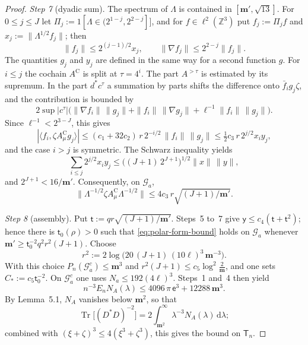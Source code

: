 \documentclass[11pt]{amsart}
\theoremstyle{definition}
\begin{document}
\begin{proof}
\emph{Step 7} (dyadic sum).
The spectrum of $\Lambda$ is contained in $[\mathbf m',\sqrt{13}]$.
For $0\le j\le J$ let $\Pi_j:=1[\Lambda\in(2^{1-j},2^{2-j}]]$, and for $f\in\ell^2(\mathbb Z^3)$ put $f_j:=\Pi_jf$ and $x_j:=\|\Lambda^{1/2}f_j\|$; then
\begin{equation*}
\|f_j\|\le2^{(j-1)/2}x_j,\qquad\|\nabla f_j\|\le2^{2-j}\|f_j\|.
\end{equation*}
The quantities $g_j$ and $y_j$ are defined in the same way for a second function $g$.
For $i\le j$ the cochain $A^{\mathrm C}$ is split at $\tau=4^i$.
The part $A^{>\tau}$ is estimated by its supremum.
In the part $d^*c^\tau$ a summation by parts shifts the difference onto $\bar f_ig_j\zeta$, and the contribution is bounded by
\begin{equation*}
2\sup|c^\tau|\bigl(\|\nabla f_i\|\,\|g_j\|+\|f_i\|\,\|\nabla g_j\|+\ell^{-1}\|f_i\|\,\|g_j\|\bigr).
\end{equation*}
Since $\ell^{-1}<2^{3-J}$, this gives
\begin{equation*}
|\langle f_i,\zeta A^{\mathrm C}_\mu g_j\rangle|\le(c_1+32c_2)\,r\,2^{-i/2}\,\|f_i\|\,\|g_j\|\le\tfrac12c_3\,r\,2^{j/2}x_iy_j,
\end{equation*}
and the case $i>j$ is symmetric.
The Schwarz inequality yields
\begin{equation*}
\sum_{i\le j}2^{j/2}x_iy_j\le\bigl((J+1)\,2^{J+1}\bigr)^{1/2}\|x\|\,\|y\|,
\end{equation*}
and $2^{J+1}<16/\mathbf m'$.
Consequently, on $\mathcal G_a$,
\begin{equation*}
\|\Lambda^{-1/2}\zeta A^{\mathrm C}_\mu\Lambda^{-1/2}\|\le4c_3\,r\sqrt{(J+1)/\mathbf m'}.
\end{equation*}

\emph{Step 8} (assembly).
Put $\mathsf t:=qr\sqrt{(J+1)/\mathbf m'}$.
Steps~5 to~7 give $\mathsf y\le c_4(\mathsf t+\mathsf t^2)$; hence there is $\mathsf t_0(\rho)>0$ such that \eqref{eq:polar-form-bound} holds on $\mathcal G_a$ whenever $\mathbf m'\ge\mathsf t_0^{-2}q^2r^2(J+1)$.
Choose
\begin{equation*}
r^2:=2\log\bigl(20\,(J+1)\,(10\ell)^3\,\mathbf m^{-3}\bigr).
\end{equation*}
With this choice $P_n(\mathcal G_a^c)\le\mathbf m^3$ and $r^2(J+1)\le c_5\log^2\frac2{\mathbf m}$, and one sets $C_*:=c_5\mathsf t_0^{-2}$.
On $\mathcal G_a^c$ one uses $N_a\le192(4\ell)^3$.
Steps~1 and~4 then yield
\begin{equation*}
n^{-3}E_nN_A(\lambda)\le4096\,\pi\,\mathsf e^3+12288\,\mathbf m^3.
\end{equation*}
By Lemma~5.1, $N_A$ vanishes below $\mathbf m^2$, so that
\begin{equation*}
\operatorname{Tr}\bigl[(D^*D)^{-2}\bigr]=2\int_{\mathbf m^2}^\infty\lambda^{-3}N_A(\lambda)\,\mathrm d\lambda;
\end{equation*}
combined with $(\xi+\zeta)^3\le4(\xi^3+\zeta^3)$, this gives the bound on $\mathsf T_n$.
\end{proof}
\end{document}
